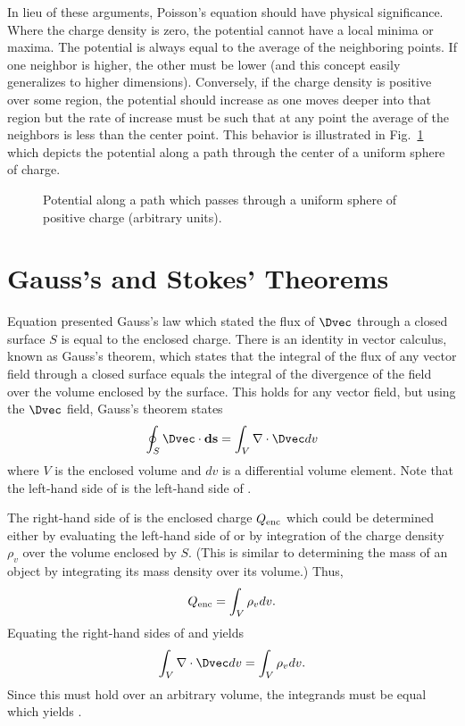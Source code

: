 In lieu of these arguments, Poisson's equation 
should have physical significance.  Where the charge density is zero,
the potential cannot have a local minima or maxima.  The potential is
always equal to the average of the neighboring points.  If one
neighbor is higher, the other must be lower (and this concept easily
generalizes to higher dimensions).  Conversely, if the charge density
is positive over some region, the potential should increase as one
moves deeper into that region but the rate of increase must be such
that at any point the average of the neighbors is less than the center
point.  This behavior is illustrated in Fig.\ \ref{fig:chargeSphere}
which depicts the potential along a path through the center of a
uniform sphere of charge.
\begin{figure}
  \begin{center}
  \end{center}
  \caption{Potential along a path which passes through a uniform
  sphere of positive charge (arbitrary units). \label{fig:chargeSphere}}
\end{figure}

\section{Gauss's and Stokes' Theorems}

Equation  presented Gauss's law which stated the flux
of $\Dvec$ through a closed surface $S$ is equal to the enclosed
charge.  There is an identity in vector calculus, known as Gauss's
theorem, which states that the integral of the flux of any vector
field through a closed surface equals the integral of the divergence
of the field over the volume enclosed by the surface.  This holds for
any vector field, but using the $\Dvec$ field, Gauss's theorem states
\begin{equation}
  \oint_S \Dvec\cdot\mathbf{ds} = 
  \int_V \nabla\cdot \Dvec dv
  \label{eq:gaussTheorem}
\end{equation}
where $V$ is the enclosed volume and $dv$ is a differential volume
element.  Note that the left-hand side of  is
the left-hand side of .

The right-hand side of  is the enclosed charge
$Q_{\mbox{\scriptsize enc}}$ which could be determined either by
evaluating the left-hand side of  or by integration of
the charge density $\rho_v$ over the volume enclosed by $S$.  (This is
similar to determining the mass of an object by integrating its mass
density over its volume.)  Thus,
\begin{equation}
  Q_{\mbox{\scriptsize enc}} =
  \int_V \rho_v dv.
  \label{eq:chargeIntegral}
\end{equation}
Equating the right-hand sides of  and
 yields
\begin{equation}
  \int_V \nabla\cdot \Dvec dv =
  \int_V \rho_v dv.
\end{equation}
Since this must hold over an arbitrary volume, the integrands must be
equal which yields .

